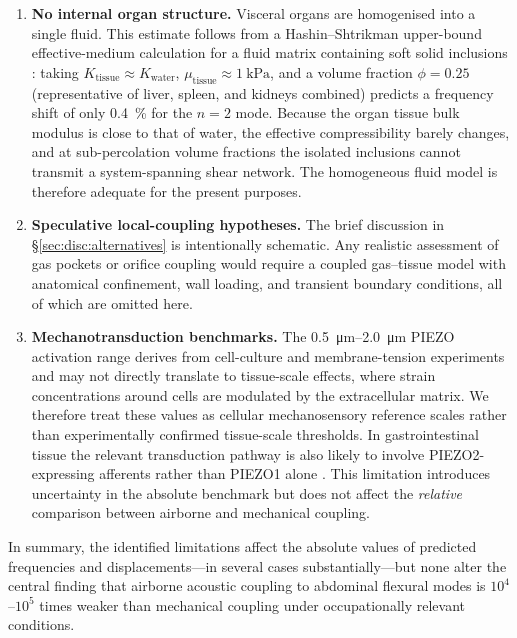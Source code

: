 \begin{enumerate}
  \item \textbf{No internal organ structure.}  Visceral organs are
    homogenised into a single fluid.  This estimate follows from a
    Hashin--Shtrikman upper-bound effective-medium calculation for a fluid
    matrix containing soft solid inclusions \cite{Hashin1963}: taking
    $K_\mathrm{tissue} \approx K_\mathrm{water}$,
    $\mu_\mathrm{tissue} \approx \SI{1}{\kilo\pascal}$, and a volume fraction
    $\phi = 0.25$ (representative of liver, spleen, and kidneys combined)
    predicts a frequency shift of only \SI{0.4}{\percent} for the $n=2$ mode.
    Because the organ tissue bulk modulus is close to that of water, the
    effective compressibility barely changes, and at sub-percolation volume
    fractions the isolated inclusions cannot transmit a system-spanning shear
    network.  The homogeneous fluid model is therefore adequate for the
    present purposes.

    \item \textbf{Speculative local-coupling hypotheses.}  The brief discussion
    in \S\ref{sec:disc:alternatives} is intentionally schematic.  Any
    realistic assessment of gas pockets or orifice coupling would require a
    coupled gas--tissue model with anatomical confinement, wall loading, and
    transient boundary conditions, all of which are omitted here.

  \item \textbf{Mechanotransduction benchmarks.}  The
    \SIrange{0.5}{2.0}{\micro\metre} PIEZO activation range
    \cite{coste2010piezo1,Lewis2015,Xiao2024} derives from cell-culture and
    membrane-tension experiments and may not directly translate to
    tissue-scale effects, where strain concentrations around cells are
    modulated by the extracellular matrix.  We therefore treat these values as
    cellular mechanosensory reference scales rather than experimentally confirmed tissue-scale
    thresholds.  In gastrointestinal tissue the
    relevant transduction pathway is also likely to involve PIEZO2-expressing
    afferents rather than PIEZO1 alone \cite{ServinVences2023}.  This
    limitation introduces uncertainty in the absolute benchmark but does not
    affect the \emph{relative} comparison between airborne and mechanical
    coupling.

\end{enumerate}

\noindent
In summary, the identified limitations affect the absolute values of
predicted frequencies and displacements---in several cases substantially---but
none alter the central finding that airborne acoustic coupling to abdominal
flexural modes is $10^4$--$10^5$ times weaker than mechanical coupling under
occupationally relevant conditions.

